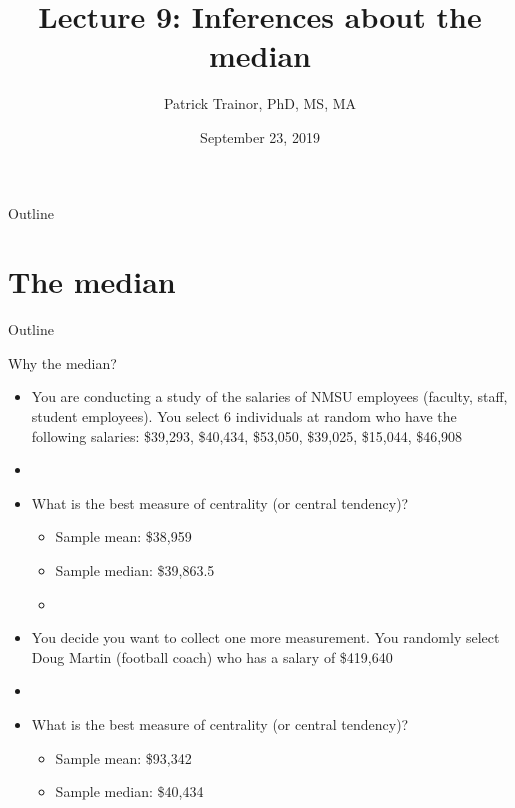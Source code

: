 \documentclass[xcolor=dvipsnames]{beamer}
\title[Lecture 9]{Lecture 9: Inferences about the median}
\author[Patrick Trainor]{Patrick Trainor, PhD, MS, MA}
\institute[NMSU]{New Mexico State University}
\date{September 23, 2019}
\begin{document}
\begin{frame}
	\maketitle
\end{frame}

\begin{frame}{Outline}
	\tableofcontents[hideallsubsections]
\end{frame}

\section{The median}
\begin{frame}{Outline}
\tableofcontents[currentsection,subsectionstyle=show/shaded/hide]
\end{frame}

\begin{frame}{Why the median?}
	\begin{itemize}
		\item You are conducting a study of the salaries of NMSU employees (faculty, staff, student employees). You select 6 individuals at random who have the following salaries: \$39,293, \$40,434, \$53,050, \$39,025, \$15,044, \$46,908
		\item[]
		\item What is the best measure of centrality (or central tendency)?
		\begin{itemize}
			\item Sample mean: \$38,959
			\item Sample median: \$39,863.5
			\item[]
		\end{itemize}
	\item You decide you want to collect one more measurement. You randomly select Doug Martin (football coach) who has a salary of \$419,640
	\item[]
			\item What is the best measure of centrality (or central tendency)?
	\begin{itemize}
		\item Sample mean: \$93,342
		\item Sample median: \$40,434
	\end{itemize}
	\end{itemize}
\end{frame}
\end{document}
